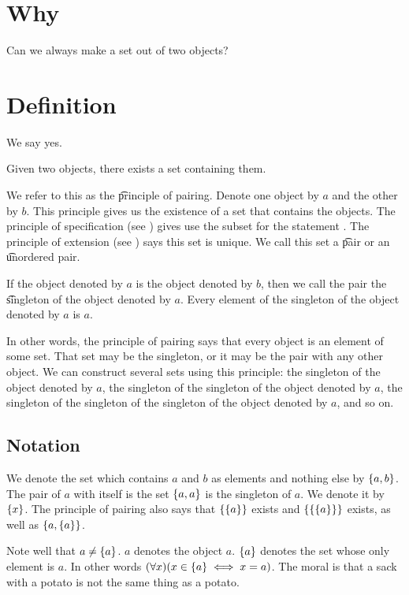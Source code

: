
\section*{Why}

Can we always make a set out of two objects?

\section*{Definition}

We say yes.
\begin{principle}[Pairing]Given two objects, there exists a set containing them.\end{principle}
We refer to this as the \t{principle of pairing}.
Denote one object by $a$ and the other by $b$.
This principle gives us the existence of a set that contains the objects.
The principle of specification (see ) gives use the subset for the statement .
The principle of extension (see ) says this set is unique.
We call this set a \t{pair} or an \t{unordered pair}.

If the object denoted by $a$ is the object denoted by $b$, then we call the pair the \t{singleton} of the object denoted by $a$.
Every element of the singleton of the object denoted by $a$ is $a$.

In other words, the principle of pairing says that every object is an element of some set.
That set may be the singleton, or it may be the pair with any other object.
We can construct several sets using this principle: the singleton of the object denoted by $a$, the singleton of the singleton of the object denoted by $a$, the singleton of the singleton of the singleton of the object denoted by $a$, and so on.

\subsection*{Notation}

We denote the set which contains $a$ and $b$ as elements and nothing else by $\{a, b\}$.
The pair of $a$ with itself is the set $\{a, a\}$ is the singleton of $a$.
We denote it by $\{x\}$.
The principle of pairing also says that $\{\{a\}\}$ exists and $\{\{\{a\}\}\}$ exists, as well as $\{a, \{a\}\}$.

Note well that $a \neq \{a\}$.
$a$ denotes the object $a$.
$\{a\}$ denotes the set whose only element is $a$.
In other words $(\forall x)(x \in \{a\} \iff x = a)$.
The moral is that a sack with a potato is not the same thing as a potato.
